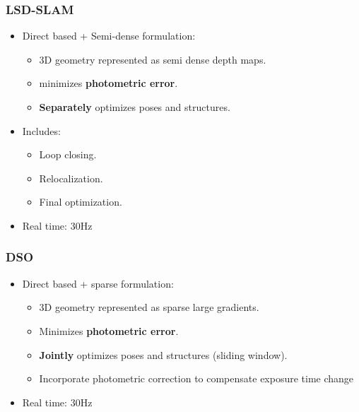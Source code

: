 \documentclass[a4paper,12 pt]{article}
\theoremstyle{definition}
\theoremstyle{remark}
\theoremstyle{definition}
\theoremstyle{definition}
\theoremstyle{definition}
\theoremstyle{remark}
\theoremstyle{definition}
\begin{document}
\subsubsection*{LSD-SLAM}
\begin{itemize}
\item Direct based + Semi-dense formulation:
\begin{itemize}
\item 3D geometry represented as semi dense depth maps.
\item minimizes \textbf{photometric error}.
\item \textbf{Separately} optimizes poses and structures.
\end{itemize}
\item Includes:
\begin{itemize}
\item Loop closing.
\item Relocalization.
\item Final optimization.
\end{itemize}
\item Real time: 30Hz
\end{itemize}

\subsubsection*{DSO}
\begin{itemize}
\item Direct based + sparse formulation:
\begin{itemize}
\item 3D geometry represented as sparse large gradients.
\item Minimizes \textbf{photometric error}.
\item \textbf{Jointly} optimizes poses and structures (sliding window).
\item Incorporate photometric correction to compensate exposure time change
\end{itemize}
\item Real time: 30Hz
\end{itemize}
\end{document}
